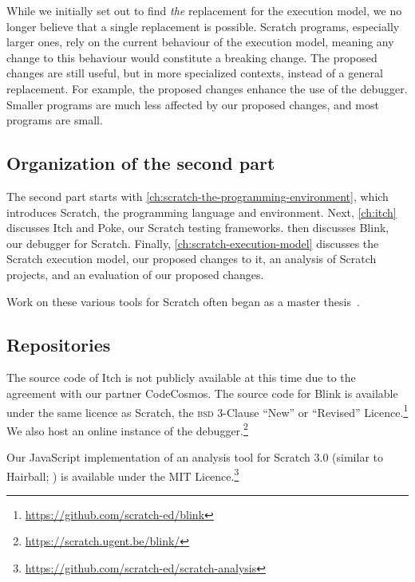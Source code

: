 \documentclass[../main]{subfiles}
\begin{document}
While we initially set out to find \textit{the} replacement for the execution model, we no longer believe that a single replacement is possible.
Scratch programs, especially larger ones, rely on the current behaviour of the execution model, meaning any change to this behaviour would constitute a breaking change.
The proposed changes are still useful, but in more specialized contexts, instead of a general replacement.
For example, the proposed changes enhance the use of the debugger.
Smaller programs are much less affected by our proposed changes, and most programs are small.

\subsection{Organization of the second part}\label{subsec:organization-of-the-second-part}

The second part starts with \cref{ch:scratch-the-programming-environment}, which introduces Scratch, the programming language and environment.
Next, \cref{ch:itch} discusses Itch and Poke, our Scratch testing frameworks.
 then discusses Blink, our debugger for Scratch.
Finally, \cref{ch:scratch-execution-model} discusses the Scratch execution model, our proposed changes to it, an analysis of Scratch projects, and an evaluation of our proposed changes.

Work on these various tools for Scratch often began as a master thesis~\autocite{makItchEenEducatief2019,voetenEenBlokgebaseerdTestframework2023,goethalsEenTimeTravelling2023,deproftBlinkEenEducatieve2022,cattoireEenNieuwUitvoeringsmodel2024}.

\subsection{Repositories}\label{subsec:repositories-and-code-scratch}

The source code of Itch is not publicly available at this time due to the agreement with our partner CodeCosmos.
The source code for Blink is available under the same licence as Scratch, the \textsc{bsd} 3-Clause ``New'' or ``Revised'' Licence.\footnote{\url{https://github.com/scratch-ed/blink}}
We also host an online instance of the debugger.\footnote{\url{https://scratch.ugent.be/blink/}}

Our JavaScript implementation of an analysis tool for Scratch 3.0 (similar to Hairball; \cite{boeHairballLintinspiredStatic2013}) is available under the MIT Licence.\footnote{\url{https://github.com/scratch-ed/scratch-analysis}}
\end{document}
